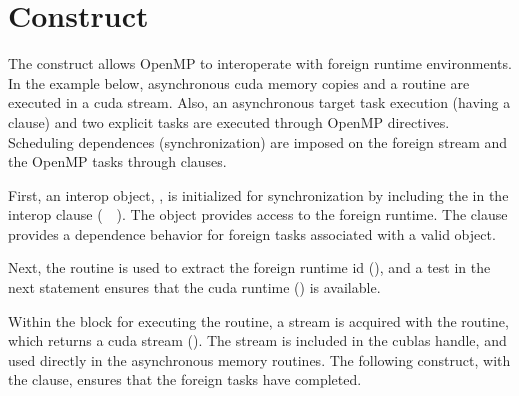\pagebreak
\section{ Construct}
\label{sec:interop}

The  construct allows OpenMP to interoperate with foreign runtime environments.
In the example below, asynchronous cuda memory copies and a  routine are executed 
in a cuda stream. Also, an asynchronous target task execution (having a  clause) 
and two explicit tasks are executed through OpenMP directives.  Scheduling dependences (synchronization) are
imposed on the foreign stream and the OpenMP tasks through  clauses. 

First, an interop object, , is initialized for synchronization by including the
  in the interop  clause 
(~~\scode{)}).  
The object provides access to the foreign runtime.
The  clause provides a dependence behavior
for foreign tasks associated with a valid object.

Next, the  routine is used to extract the foreign 
runtime id (), and a test in the next statement ensures 
that the cuda runtime () is available.

Within the block for executing the  routine, a stream is acquired 
with the  routine, which returns a cuda stream ().
The stream is included in the cublas handle, and used directly in the asynchronous memory
routines.  The following  construct, with the  clause, 
ensures that the foreign tasks have completed.


